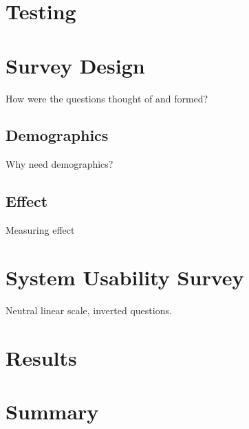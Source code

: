 \documentclass{l4proj}
\begin{document}
\section{Testing}


\section{Survey Design}

How were the questions thought of and formed?

\subsection{Demographics}

Why need demographics?

\subsection{Effect}

Measuring effect

\section{System Usability Survey}

Neutral linear scale, inverted questions.

\section{Results}




\section*{Summary}
\end{document}
